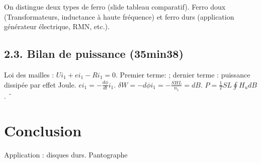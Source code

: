 \documentclass[french, a4paper, 10pt, twocolumn, landscape]{article}
\begin{document}
On distingue deux types de ferro (slide tableau comparatif). Ferro doux (Transformateurs, inductance à haute fréquence) et ferro durs (application générateur électrique, RMN, etc.).

\subsection*{2.3. Bilan de puissance (35min38)}

Loi des mailles : $U i_1 + e i_1 - R i_1 = 0$. Premier terme: ; dernier terme : puissance dissipée par effet Joule. $e i_1 = - \frac{d \phi}{d t} i_1$. $\delta W = - d \phi i_1 = - \frac{SHL}{n_1} = d B$. $P = \frac{1}{T} SL \oint H _ud B$. ¨

\section*{Conclusion}

Application : disques durs. Pantographe
\end{document}

